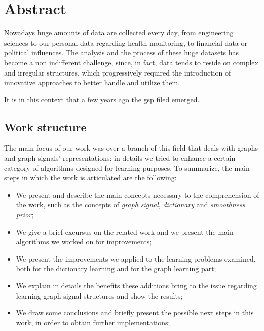 \chapter{Abstract}
\label{ch:introduction}
Nowadays huge amounts of data are collected every day, from engineering sciences to our personal data regarding health monitoring, to financial data or political influences. The analysis and the process of these huge datasets has become a non indifferent challenge, since, in fact, data tends to reside on complex and irregular structures, which progressively required the introduction of innovative approaches to better handle and utilize them. \cite{Ortega2017} \cite{Sandry}

It is in this context that a few years ago the \gls{gsp} filed emerged.

\section{Work structure}
The main focus of our work was over a branch of this field that deals with graphs and graph signals' representations: in details we tried to enhance a certain category of algorithms designed for learning purposes.
To summarize, the main steps in which the work is articulated are the following:
\begin{itemize}
\item We present and describe the main concepts necessary to the comprehension of the work, such as the concepts of \textit{graph signal}, \textit{dictionary} and \textit{smoothness prior};
\item We give a brief excursus on the related work and we present the main algorithms we worked on for improvements;
\item We present the improvements we applied to the learning problems examined, both for the dictionary learning and for the graph learning part;
\item We explain in details the benefits these additions bring to the issue regarding learning graph signal structures and show the results;
\item We draw some conclusions and briefly present the possible next steps in this work, in order to obtain further implementations;
\end{itemize}
